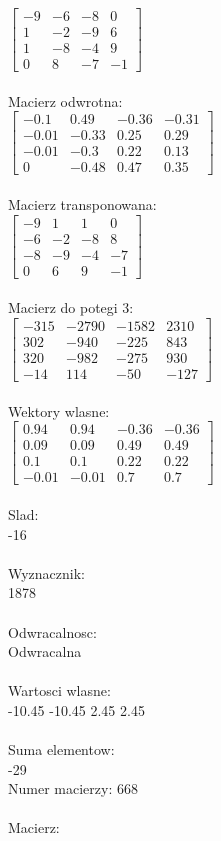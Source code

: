 \documentclass[a4paper,12pt]{article}
\begin{document}
$\begin{bmatrix} -9&-6&-8&0\\1&-2&-9&6\\1&-8&-4&9\\0&8&-7&-1 \end{bmatrix}$
\\
\\
Macierz odwrotna:\\

$\begin{bmatrix} -0.1&0.49&-0.36&-0.31\\-0.01&-0.33&0.25&0.29\\-0.01&-0.3&0.22&0.13\\0&-0.48&0.47&0.35 \end{bmatrix}$
\\
\\
Macierz transponowana:\\

$\begin{bmatrix} -9&1&1&0\\-6&-2&-8&8\\-8&-9&-4&-7\\0&6&9&-1 \end{bmatrix}$
\\
\\
Macierz do potegi 3:\\

$\begin{bmatrix} -315&-2790&-1582&2310\\302&-940&-225&843\\320&-982&-275&930\\-14&114&-50&-127 \end{bmatrix}$
\\
\\
Wektory wlasne:\\

$\begin{bmatrix} 0.94&0.94&-0.36&-0.36\\0.09&0.09&0.49&0.49\\0.1&0.1&0.22&0.22\\-0.01&-0.01&0.7&0.7 \end{bmatrix}$
\\
\\
Slad:\\
-16
\\
\\
Wyznacznik:\\
1878
\\
\\
Odwracalnosc:\\
Odwracalna
\\
\\
Wartosci wlasne:\\
-10.45 -10.45 2.45 2.45
\\
\\
Suma elementow:\\
-29
\\
\newpage
Numer macierzy:
668
\\
\\
Macierz:\\
\end{document}
